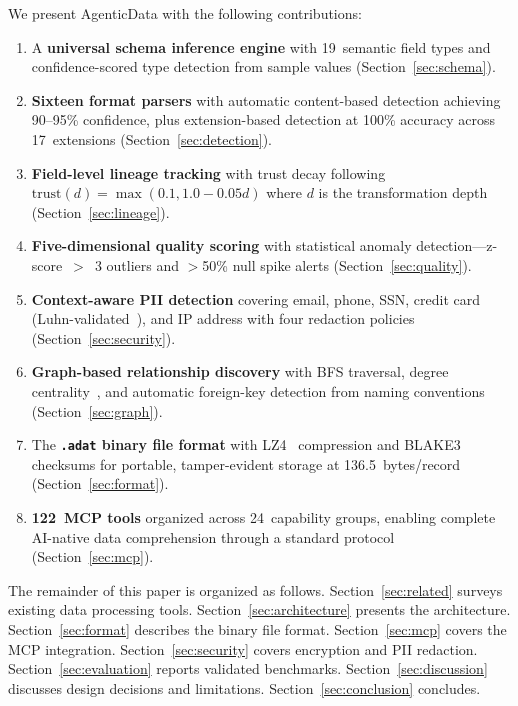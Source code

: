 \documentclass[10pt, twocolumn]{article}
\begin{document}
We present AgenticData with the following contributions:
\begin{enumerate}[nosep, leftmargin=*]
  \item A \textbf{universal schema inference engine} with 19~semantic field types and confidence-scored type detection from sample values (Section~\ref{sec:schema}).
  \item \textbf{Sixteen format parsers} with automatic content-based detection achieving 90--95\% confidence, plus extension-based detection at 100\% accuracy across 17~extensions (Section~\ref{sec:detection}).
  \item \textbf{Field-level lineage tracking} with trust decay following $\text{trust}(d) = \max(0.1, 1.0 - 0.05d)$ where $d$ is the transformation depth (Section~\ref{sec:lineage}).
  \item \textbf{Five-dimensional quality scoring} with statistical anomaly detection---z-score~$>$~3 outliers and $>$50\% null spike alerts (Section~\ref{sec:quality}).
  \item \textbf{Context-aware PII detection} covering email, phone, SSN, credit card (Luhn-validated~\cite{luhn1960computer}), and IP address with four redaction policies (Section~\ref{sec:security}).
  \item \textbf{Graph-based relationship discovery} with BFS traversal, degree centrality~\cite{page1999pagerank}, and automatic foreign-key detection from naming conventions (Section~\ref{sec:graph}).
  \item The \textbf{\texttt{.adat} binary file format} with LZ4~\cite{lz4_2011} compression and BLAKE3~\cite{blake3_2020} checksums for portable, tamper-evident storage at 136.5~bytes/record (Section~\ref{sec:format}).
  \item \textbf{122~MCP tools} organized across 24~capability groups, enabling complete AI-native data comprehension through a standard protocol (Section~\ref{sec:mcp}).
\end{enumerate}

The remainder of this paper is organized as follows. Section~\ref{sec:related} surveys existing data processing tools. Section~\ref{sec:architecture} presents the architecture. Section~\ref{sec:format} describes the binary file format. Section~\ref{sec:mcp} covers the MCP integration. Section~\ref{sec:security} covers encryption and PII redaction. Section~\ref{sec:evaluation} reports validated benchmarks. Section~\ref{sec:discussion} discusses design decisions and limitations. Section~\ref{sec:conclusion} concludes.
\end{document}
